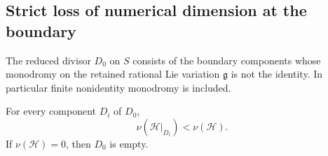 \subsection{Strict loss of numerical dimension at the boundary}

The reduced divisor $D_0$ on $S$ consists of the boundary components
whose monodromy on the retained rational Lie variation
$\mathfrak g$ is not the identity.  In particular finite
nonidentity monodromy is included.

\begin{proposition}\label{prop:boundary-drop}
For every component $D_i$ of $D_0$,
\begin{equation}\label{eq:boundary-strict-drop}
                 \nu(\mathcal H|_{D_i})<\nu(\mathcal H).
\end{equation}
If $\nu(\mathcal H)=0$, then $D_0$ is empty.
\end{proposition}

